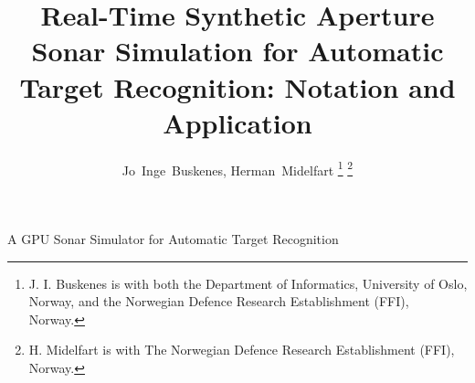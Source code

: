 
\suppressfloats


\title{Real-Time Synthetic Aperture Sonar Simulation for Automatic Target Recognition: Notation and Application}

\author{{Jo~Inge~Buskenes, %
        Herman~Midelfart%
        } %
\thanks{J. I. Buskenes is with both the Department of Informatics, University of Oslo, Norway, and the Norwegian Defence Research Establishment (FFI), Norway.}%
\thanks{H. Midelfart is with The Norwegian Defence Research Establishment (FFI), Norway.}%
}

%
{A GPU Sonar Simulator for Automatic Target Recognition}




